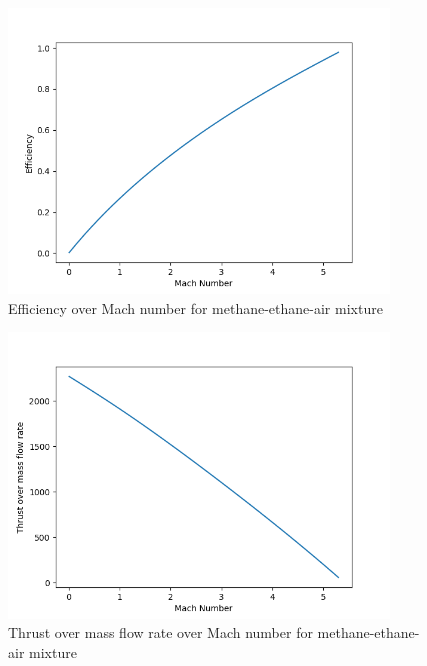 \documentclass[a4paper,11pt]{article}
\begin{document}
	\begin{figure}[H]
		\centering
		\includegraphics[width=0.9\textwidth]{metan(1mol)_etan(0.4mol)_pow/Efficiency_over_Mach.png}
       		\caption{Efficiency over Mach number for methane-ethane-air mixture}
	\end{figure}
	\begin{figure}[H]
		\centering
		\includegraphics[width=0.9\textwidth]{metan(1mol)_etan(0.4mol)_pow/Thrust_over_mass_flow_rate_over_Mach.png}
       		\caption{Thrust over mass flow rate over Mach number for methane-ethane-air mixture}
	\end{figure}
\end{document}
